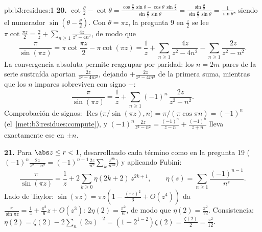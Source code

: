 \begin{solution}{pb:b3:residues:1}
\textbf{20.} $\cot\frac\theta2 - \cot\theta =
\frac{\cos\frac\theta2\,\sin\theta -
\cos\theta\,\sin\frac\theta2}{\sin\frac\theta2\,\sin\theta}
= \frac{\sin\frac\theta2}{\sin\frac\theta2\,\sin\theta} =
\frac1{\sin\theta}$, siendo el numerador $\sin(\theta -
\frac\theta2)$. Con $\theta = \pi z$, la pregunta 9 en $\frac z2$ se lee
$\pi\cot\frac{\pi z}2 = \frac2z +
\sum_{n\geq1}\frac{4z}{z^2 - 4n^2}$, de modo que
\[
\frac{\pi}{\sin(\pi z)}
= \pi\cot\frac{\pi z}2 - \pi\cot(\pi z)
= \frac1z + \sum_{n\geq1}\frac{4z}{z^2 - 4n^2}
- \sum_{n\geq1}\frac{2z}{z^2 - n^2} .
\]
La convergencia absoluta permite reagrupar por paridad: los $n
= 2m$ pares de la serie sustraída aportan $\frac{2z}{z^2-4m^2}$, dejando
$+\frac{2z}{z^2-4m^2}$ de la primera suma, mientras que los $n$ impares
sobreviven con signo $-$:
\[
\frac{\pi}{\sin(\pi z)} = \frac1z +
\sum_{n\geq1}(-1)^n\,\frac{2z}{z^2 - n^2} .
\]
Comprobación de signos: $\operatorname{Res}\bigl(\pi/\sin(\pi z),
n\bigr) = \pi/(\pi\cos\pi n) = (-1)^n$
(el~\cref{met:b3:residues:compute}), y $(-1)^n\frac{2z}{z^2 -
n^2} = \frac{(-1)^n}{z-n} + \frac{(-1)^n}{z+n}$ lleva exactamente ese
 en $\pm n$.

\textbf{21.} Para $\abs z \leq r < 1$, desarrollando cada término como
en la pregunta 19 ($(-1)^n\frac{2z}{z^2-n^2} =
(-1)^{n-1}\frac{2z}{n^2}\sum_k\frac{z^{2k}}{n^{2k}}$) y aplicando
Fubini:
\[
\frac{\pi}{\sin(\pi z)} = \frac1z +
2\sum_{k\geq0}\eta(2k+2)\,z^{2k+1},
\qquad
\eta(s) = \sum_{n\geq1}\frac{(-1)^{n-1}}{n^s} .
\]
Lado de Taylor: $\sin(\pi z) = \pi z(1 - \frac{(\pi z)^2}6 +
O(z^4))$ da $\frac\pi{\sin\pi z} = \frac1z +
\frac{\pi^2}6z + O(z^3)$: $2\eta(2) = \frac{\pi^2}6$, de modo que
$\eta(2) = \frac{\pi^2}{12}$. Consistencia: $\eta(2) =
\zeta(2) - 2\sum_n(2n)^{-2} = (1 - 2^{1-2})\zeta(2) =
\frac{\zeta(2)}2 = \frac{\pi^2}{12}$.


\end{solution}
